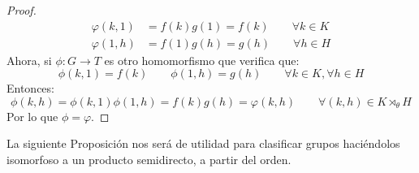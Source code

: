 \begin{teo}
\begin{proof}
        \begin{align*}
            \varphi(k,1) &= f(k)g(1) = f(k) \qquad \forall k\in K \\
            \varphi(1,h) &= f(1)g(h) = g(h) \qquad \forall h\in H
        \end{align*}
        Ahora, si $\phi:G\to T$ es otro homomorfismo que verifica que:
        \begin{equation*}
            \phi(k,1) = f(k) \qquad \phi(1,h) = g(h) \qquad \forall k\in K, \forall h\in H
        \end{equation*}
        Entonces:
        \begin{equation*}
            \phi(k,h) = \phi(k,1)\phi(1,h) = f(k)g(h) = \varphi(k,h) \qquad \forall (k,h)\in K\rtimes_\theta H
        \end{equation*}
        Por lo que $\phi = \varphi$.
    \end{proof}
\end{teo}

\noindent
La siguiente Proposición nos será de utilidad para clasificar grupos haciéndolos isomorfoso a un producto semidirecto, a partir del orden.


